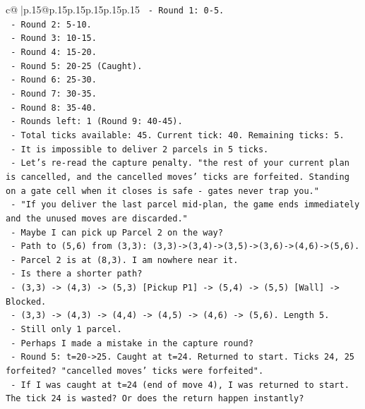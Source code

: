 \documentclass{article}
\begin{document}
{\begin{supertabular}{c@{$\;$}|p{.15\linewidth}@{}p{.15\linewidth}p{.15\linewidth}p{.15\linewidth}p{.15\linewidth}p{.15\linewidth}}
{{{\texttt{  {-} Round 1: 0{-}5.} \\
\texttt{  {-} Round 2: 5{-}10.} \\
\texttt{  {-} Round 3: 10{-}15.} \\
\texttt{  {-} Round 4: 15{-}20.} \\
\texttt{  {-} Round 5: 20{-}25 (Caught).} \\
\texttt{  {-} Round 6: 25{-}30.} \\
\texttt{  {-} Round 7: 30{-}35.} \\
\texttt{  {-} Round 8: 35{-}40.} \\
\texttt{  {-} Rounds left: 1 (Round 9: 40{-}45).} \\
\texttt{  {-} Total ticks available: 45. Current tick: 40. Remaining ticks: 5.} \\
\texttt{  {-} It is impossible to deliver 2 parcels in 5 ticks.} \\
\texttt{  {-} Let's re{-}read the capture penalty. "the rest of your current plan is cancelled, and the cancelled moves' ticks are forfeited. Standing on a gate cell when it closes is safe {-} gates never trap you."} \\
\texttt{  {-} "If you deliver the last parcel mid{-}plan, the game ends immediately and the unused moves are discarded."} \\
\texttt{  {-} Maybe I can pick up Parcel 2 on the way?} \\
\texttt{  {-} Path to (5,6) from (3,3): (3,3){-}>(3,4){-}>(3,5){-}>(3,6){-}>(4,6){-}>(5,6).} \\
\texttt{  {-} Parcel 2 is at (8,3). I am nowhere near it.} \\
\texttt{  {-} Is there a shorter path?} \\
\texttt{  {-} (3,3) {-}> (4,3) {-}> (5,3) {[}Pickup P1{]} {-}> (5,4) {-}> (5,5) {[}Wall{]} {-}> Blocked.} \\
\texttt{  {-} (3,3) {-}> (4,3) {-}> (4,4) {-}> (4,5) {-}> (4,6) {-}> (5,6). Length 5.} \\
\texttt{  {-} Still only 1 parcel.} \\
\texttt{  {-} Perhaps I made a mistake in the capture round?} \\
\texttt{  {-} Round 5: t=20{-}>25. Caught at t=24. Returned to start. Ticks 24, 25 forfeited? "cancelled moves' ticks were forfeited".} \\
\texttt{  {-} If I was caught at t=24 (end of move 4), I was returned to start. The tick 24 is wasted? Or does the return happen instantly?} \\
}}}
\end{supertabular}}
\end{document}
